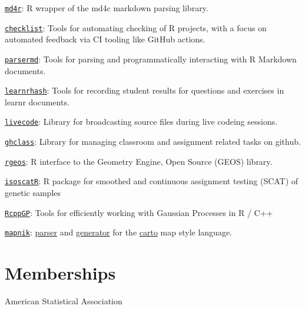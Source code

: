 \documentclass[margin,line]{res}
\begin{document}
\begin{resume}
\href{https://github.com/rundel/md4r}{\texttt{md4r}}: R wrapper of the md4c markdown parsing library.

\href{https://github.com/rundel/checklist}{\texttt{checklist}}: Tools for automating checking of R projects, with a focus on automated feedback via CI tooling like GitHub actions.

\href{https://github.com/rundel/parsermd}{\texttt{parsermd}}: Tools for parsing and programmatically interacting with R Markdown documents.

\href{https://github.com/rundel/learnrhash}{\texttt{learnrhash}}: Tools for recording student results for questions and exercises in learnr documents.

\href{https://github.com/rundel/livecode}{\texttt{livecode}}: Library for broadcasting source files during live codeing sessions.

\href{https://github.com/rundel/ghclass}{\texttt{ghclass}}: Library for managing classroom and assignment related tasks on github.

\href{https://cran.r-project.org/package=rgeos}{\texttt{rgeos}}: R interface to the Geometry Engine, Open Source (GEOS) library.

\vspace{-0.15cm}
\href{https://github.com/rundel/isoscatR}{\texttt{isoscatR}}: R package for smoothed and continuous assignment testing (SCAT) of genetic samples

\vspace{-0.15cm}
\href{https://github.com/rundel/RcppGP}{\texttt{RcppGP}}: Tools for efficiently working with Gaussian Processes in R / C++

\vspace{-0.15cm}
\href{http://mapnik.org}{\texttt{mapnik}}: \href{https://github.com/rundel/carto-parser}{parser} and \href{https://github.com/rundel/carto-generator}{generator} for the \href{https://github.com/mapbox/carto}{carto} map style language.

\vspace{4mm}

\section{\sc Memberships}
American Statistical Association 

\end{resume}
\end{document}
